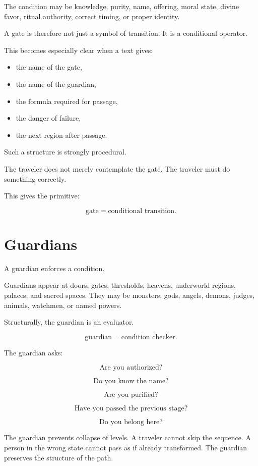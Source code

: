 \documentclass[11pt]{book}
\begin{document}
The condition may be knowledge, purity, name, offering, moral state, divine favor, ritual authority, correct timing, or proper identity.

A gate is therefore not just a symbol of transition. It is a conditional operator.

This becomes especially clear when a text gives:

\begin{itemize}
    \item the name of the gate,
    \item the name of the guardian,
    \item the formula required for passage,
    \item the danger of failure,
    \item the next region after passage.
\end{itemize}

Such a structure is strongly procedural.

The traveler does not merely contemplate the gate. The traveler must do something correctly.

This gives the primitive:

\[
\text{gate} = \text{conditional transition}.
\]

\section{Guardians}

A guardian enforces a condition.

Guardians appear at doors, gates, thresholds, heavens, underworld regions, palaces, and sacred spaces. They may be monsters, gods, angels, demons, judges, animals, watchmen, or named powers.

Structurally, the guardian is an evaluator.

\[
\text{guardian} = \text{condition checker}.
\]

The guardian asks:

\[
\text{Are you authorized?}
\]

\[
\text{Do you know the name?}
\]

\[
\text{Are you purified?}
\]

\[
\text{Have you passed the previous stage?}
\]

\[
\text{Do you belong here?}
\]

The guardian prevents collapse of levels. A traveler cannot skip the sequence. A person in the wrong state cannot pass as if already transformed. The guardian preserves the structure of the path.
\end{document}
